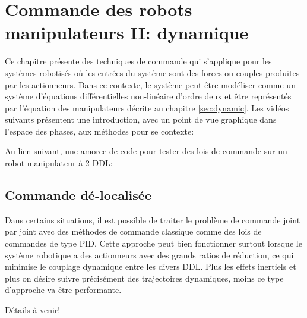 \chapter{Commande des robots manipulateurs II: dynamique}

Ce chapitre présente des techniques de commande qui s'applique pour les systèmes robotisés où les entrées du système sont des forces ou couples produites par les actionneurs. Dans ce contexte, le système peut être modéliser comme un système d'équations différentielles non-linéaire d'ordre deux et être représentés par l'équation des manipulateurs décrite au chapitre \ref{sec:dynamic}.  Les vidéos suivants présentent une introduction, avec un point de vue graphique dans l'espace des phases, aux méthodes pour se contexte:


Au lien suivant, une amorce de code pour tester des lois de commande sur un robot manipulateur à 2 DDL:




\newpage
\section{Commande dé-localisée}

Dans certains situations, il est possible de traiter le problème de commande joint par joint avec des méthodes de commande classique comme des lois de commandes de type PID. Cette approche peut bien fonctionner surtout lorsque le système robotique a des actionneurs avec des grands ratios de réduction, ce qui minimise le couplage dynamique entre les divers DDL. Plus les effets inertiels et plus on désire suivre précisément des trajectoires dynamiques, moins ce type d'approche va être performante.


Détails à venir!


\newpage
